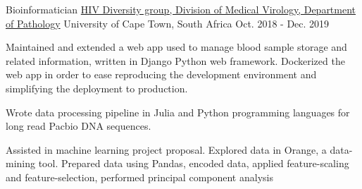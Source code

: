 

\begin{cventries}

  \cventry
    {Bioinformatician} %
    {\href{http://www.virology.uct.ac.za/vir/research/hiv-diversity-group}{HIV Diversity group, Division of Medical Virology, Department of Pathology}} %
    {University of Cape Town, South Africa} %
    {Oct. 2018 - Dec. 2019} %
    {
      \begin{cvitems} %
        \item {Maintained and extended a web app used to manage blood sample storage and related information, written in Django Python web framework.
Dockerized the web app in order to ease reproducing the development environment and simplifying the deployment to production.}
        \item {Wrote data processing pipeline in Julia and Python programming languages for long read Pacbio DNA sequences.}
        \item {Assisted in machine learning project proposal. Explored data in Orange, a data-mining tool. Prepared data using Pandas, encoded data, applied
feature-scaling and feature-selection, performed principal component analysis}
      \end{cvitems}
    }


\end{cventries}
